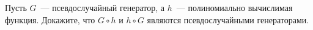 Пусть $G$~--- псевдослучайный генератор, а $h$~--- полиномиально вычислимая функция. Докажите, что
$G \circ h$ и $h \circ G$ являются псевдослучайными генераторами.
